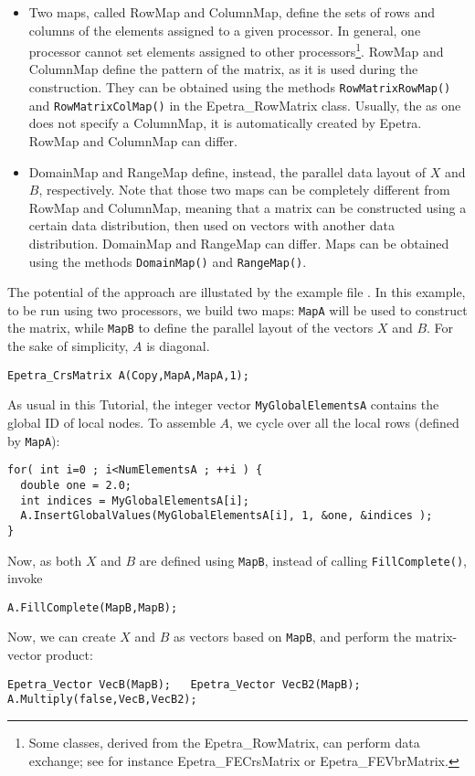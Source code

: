 \begin{itemize}
\item Two maps, called RowMap and ColumnMap, define the sets of rows and
  columns of the elements assigned to a given processor. In general, one
  processor cannot set elements assigned to other
  processors\footnote{Some classes, derived from the Epetra\_RowMatrix,
    can perform data exchange; see for instance Epetra\_FECrsMatrix or
    Epetra\_FEVbrMatrix.}. RowMap and ColumnMap define the pattern of
  the matrix, as it is used during the construction. They can be
  obtained using the methods \verb!RowMatrixRowMap()!  and
  \verb!RowMatrixColMap()! in the Epetra\_RowMatrix class. Usually, the
  as one does not specify a ColumnMap, it is automatically created by
  Epetra.  RowMap and ColumnMap can differ.
\item DomainMap and RangeMap define, instead, the parallel data layout
  of $X$ and $B$, respectively. Note that those two maps can be
  completely different from RowMap and ColumnMap, meaning that a matrix
  can be constructed using a certain data distribution, then used on
  vectors with another data distribution. DomainMap and RangeMap can
  differ.  Maps can be obtained using the methods \verb!DomainMap()! and
  \verb!RangeMap()!.
\end{itemize}
The potential of the approach are illustated by the example file
. In this example, to be run using two
processors, we build two maps: \verb!MapA! will be used to construct the
matrix, while \verb!MapB! to define the parallel layout of the vectors
$X$ and $B$. For the sake of simplicity, $A$ is diagonal.
\begin{verbatim}
Epetra_CrsMatrix A(Copy,MapA,MapA,1);
\end{verbatim}
As usual in this Tutorial, the integer vector \verb!MyGlobalElementsA!
contains the global ID of local nodes. To assemble $A$, we cycle over
all the local rows (defined by \verb!MapA!):
\begin{verbatim}
for( int i=0 ; i<NumElementsA ; ++i ) {
  double one = 2.0;
  int indices = MyGlobalElementsA[i];
  A.InsertGlobalValues(MyGlobalElementsA[i], 1, &one, &indices );
}
\end{verbatim}
Now, as both $X$ and $B$ are defined using \verb!MapB!, instead of
calling \verb!FillComplete()!, invoke
\begin{verbatim}
A.FillComplete(MapB,MapB);
\end{verbatim}
Now, we can create $X$ and $B$ as vectors based on \verb!MapB!, and
perform the matrix-vector product:
\begin{verbatim}
Epetra_Vector VecB(MapB);   Epetra_Vector VecB2(MapB);  
A.Multiply(false,VecB,VecB2);
\end{verbatim}  

